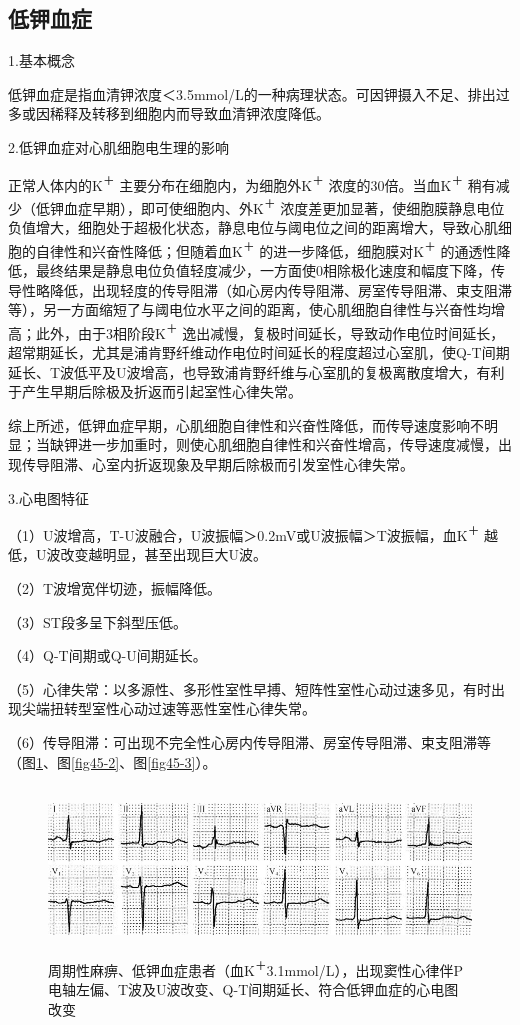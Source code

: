 \subsection{低钾血症}

1.基本概念

低钾血症是指血清钾浓度＜3.5mmol/L的一种病理状态。可因钾摄入不足、排出过多或因稀释及转移到细胞内而导致血清钾浓度降低。

2.低钾血症对心肌细胞电生理的影响

正常人体内的K\textsuperscript{＋}
主要分布在细胞内，为细胞外K\textsuperscript{＋}
浓度的30倍。当血K\textsuperscript{＋}
稍有减少（低钾血症早期），即可使细胞内、外K\textsuperscript{＋}
浓度差更加显著，使细胞膜静息电位负值增大，细胞处于超极化状态，静息电位与阈电位之间的距离增大，导致心肌细胞的自律性和兴奋性降低；但随着血K\textsuperscript{＋}
的进一步降低，细胞膜对K\textsuperscript{＋}
的通透性降低，最终结果是静息电位负值轻度减少，一方面使0相除极化速度和幅度下降，传导性略降低，出现轻度的传导阻滞（如心房内传导阻滞、房室传导阻滞、束支阻滞等），另一方面缩短了与阈电位水平之间的距离，使心肌细胞自律性与兴奋性均增高；此外，由于3相阶段K\textsuperscript{＋}
逸出减慢，复极时间延长，导致动作电位时间延长，超常期延长，尤其是浦肯野纤维动作电位时间延长的程度超过心室肌，使Q-T间期延长、T波低平及U波增高，也导致浦肯野纤维与心室肌的复极离散度增大，有利于产生早期后除极及折返而引起室性心律失常。

综上所述，低钾血症早期，心肌细胞自律性和兴奋性降低，而传导速度影响不明显；当缺钾进一步加重时，则使心肌细胞自律性和兴奋性增高，传导速度减慢，出现传导阻滞、心室内折返现象及早期后除极而引发室性心律失常。

3.心电图特征

（1）U波增高，T-U波融合，U波振幅＞0.2mV或U波振幅＞T波振幅，血K\textsuperscript{＋}
越低，U波改变越明显，甚至出现巨大U波。

（2）T波增宽伴切迹，振幅降低。

（3）ST段多呈下斜型压低。

（4）Q-T间期或Q-U间期延长。

（5）心律失常：以多源性、多形性室性早搏、短阵性室性心动过速多见，有时出现尖端扭转型室性心动过速等恶性室性心律失常。

（6）传导阻滞：可出现不完全性心房内传导阻滞、房室传导阻滞、束支阻滞等（图\ref{fig45-1}、图\ref{fig45-2}、图\ref{fig45-3}）。

\begin{figure}[!htbp]
 \centering
 \includegraphics[width=5.58333in,height=1.72917in]{./images/Image00729.jpg}
 \captionsetup{justification=centering}
 \caption{周期性麻痹、低钾血症患者（血K\textsuperscript{＋}3.1mmol/L），出现窦性心律伴P电轴左偏、T波及U波改变、Q-T间期延长、符合低钾血症的心电图改变}
 \label{fig45-1}
  \end{figure} 



